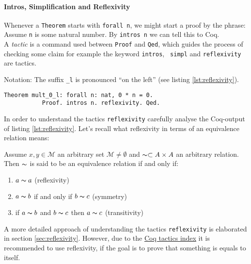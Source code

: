 	    \paragraph{Intros, Simplification and Reflexivity}
	     Whenever a \lstinline!Theorem! starts with \lstinline!forall n!, we might start a proof by the phrase:
	     Assume \lstinline!n! is some natural number. By \lstinline!intros n! we can tell this to Coq.\\
	     A {\itshape tactic} is a command used between \lstinline!Proof! and \lstinline!Qed!, 
	     which guides the process of checking some claim for example the keyword \lstinline!intros!, \lstinline! simpl! and \lstinline!reflexivity! 
	     are tactics.     
	      \begin{remark}{Notation:} 
	     The suffix \lstinline!_l! is pronounced ``on the left'' (see listing \ref{lst:reflexivity}). 
	 	 \begin{lstlisting}[caption = \lstinline!mult_0_l!, label= {lst:reflexivity}]
		 Theorem mult_0_l: forall n: nat, 0 * n = 0.
		   Proof. intros n. reflexivity. Qed.
		 \end{lstlisting}
		 \end{remark} 
	      
	    In order to understand the tactics \lstinline!reflexivity! carefully analyse the Coq-output of listing \ref{lst:reflexivity}.   
	    Let's recall what reflexivity in terms of an equivalence relation means: 
	   \begin{definition}
	   Assume $x,y\in \mathcal{M}$ an arbitrary set $\mathcal{M}\neq\emptyset$ and $\thicksim\subset A \times A$ an arbitrary relation.
	   Then $\thicksim$ is said to be an equivalence relation if and only if:
	   \begin{enumerate}
	   \item $a\thicksim a$ (reflexivity)
	   \item $a \thicksim b$ if and only if $b \thicksim c$ (symmetry)
	   \item if $a \thicksim b$ and $ b\thicksim c$ then $a \thicksim c$ (transitivity) 
	   \end{enumerate}
	   \end{definition}
	     
	    A more detailed approach of understanding the tactics \lstinline!reflexivity! is elaborated in section \ref{sec:reflexivity}.  
	    However, due to the \href{https://pjreddie.com/coq-tactics/}{Coq tactics index} it is recommended to use reflexivity, if the goal is to prove that something is equals to itself.  
	      
